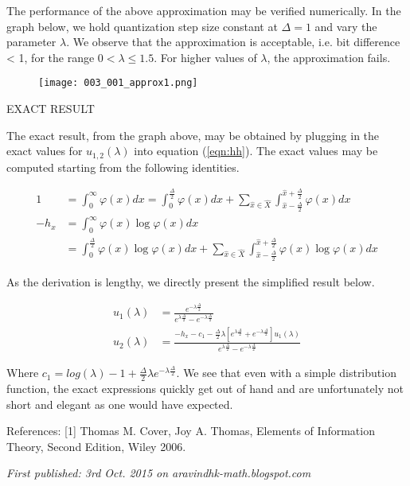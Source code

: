 The performance of the above approximation may be verified numerically. In the graph below, we hold quantization step size constant at $\Delta = 1$ and vary the parameter $\lambda$. We observe that the approximation is acceptable, i.e. bit difference < 1, for the range $0 < \lambda \leq 1.5$. For higher values of $\lambda$, the approximation fails.

\begin{figure}[H]
	\centering
	\texttt{[image: 003\_001\_approx1.png]}
\end{figure}

EXACT RESULT

The exact result, from the graph above, may be obtained by plugging in the exact values for $u_{1,2}(\lambda)$ into equation (\ref{eqn:hh}). The exact values may be computed starting from the following identities.

\begin{align} 1 &= \int_{0}^{\infty} \varphi(x) dx = \int_{0}^{\frac{\Delta}{2}} \varphi(x) dx + \sum_{\hat{x} \in \hat{X}} \int_{\hat{x} - \frac{\Delta}{2}}^{\hat{x} + \frac{\Delta}{2}} \varphi(x) dx \\ -h_x &= \int_{0}^{\infty} \varphi(x) \log \varphi(x) dx \nonumber \\ &= \int_{0}^{\frac{\Delta}{2}} \varphi(x) \log \varphi(x) dx + \sum_{\hat{x} \in \hat{X}} \int_{\hat{x} - \frac{\Delta}{2}}^{\hat{x} + \frac{\Delta}{2}} \varphi(x) \log \varphi(x) dx\end{align}

As the derivation is lengthy, we directly present the simplified result below.

\begin{align} u_1(\lambda) &= \frac{e^{-\lambda\frac{\Delta}{2}}}{e^{\lambda\frac{\Delta}{2}} - e^{-\lambda\frac{\Delta}{2}}} \\ u_2(\lambda) &= \frac{-h_x - c_1  - \frac{\Delta}{2}\lambda  \left[e^{\lambda\frac{\Delta}{2}} + e^{-\lambda\frac{\Delta}{2}}\right] u_1(\lambda)}{e^{\lambda\frac{\Delta}{2}} - e^{-\lambda\frac{\Delta}{2}}}\end{align}

Where $c_1 = log(\lambda) - 1 + \frac{\Delta}{2}\lambda e^{-\lambda\frac{\Delta}{2}}$. We see that even with a simple distribution function, the exact expressions quickly get out of hand and are unfortunately not short and elegant as one would have expected.

References:
[1] Thomas M. Cover, Joy A. Thomas, Elements of Information Theory, Second Edition, Wiley 2006.

\emph{First published: 3rd Oct. 2015 on aravindhk-math.blogspot.com}
